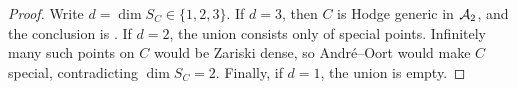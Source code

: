 \begin{proof}
Write $d=\dim S_C\in\{1,2,3\}$. If $d=3$, then $C$ is Hodge generic
in $\mathcal A_2$, and the conclusion is . If $d=2$, the union
consists only of special points. Infinitely many such points on $C$
would be Zariski dense, so Andr\'e--Oort
\cite[Theorem~1.1]{PilaTsimerman2013} would make $C$ special,
contradicting $\dim S_C=2$. Finally, if $d=1$, the union is empty.
\end{proof}
